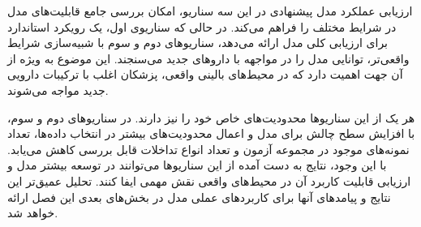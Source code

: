 ارزیابی عملکرد مدل پیشنهادی در این سه سناریو، امکان بررسی جامع قابلیت‌های مدل در شرایط مختلف را فراهم می‌کند. در حالی که سناریوی اول، یک رویکرد استاندارد برای ارزیابی کلی مدل ارائه می‌دهد، سناریوهای دوم و سوم با شبیه‌سازی شرایط واقعی‌تر، توانایی مدل را در مواجهه با داروهای جدید می‌سنجند. این موضوع به ویژه از آن جهت اهمیت دارد که در محیط‌های بالینی واقعی، پزشکان اغلب با ترکیبات دارویی جدید مواجه می‌شوند.

هر یک از این سناریوها محدودیت‌های خاص خود را نیز دارند. در سناریوهای دوم و سوم، با افزایش سطح چالش برای مدل و اعمال محدودیت‌های بیشتر در انتخاب داده‌ها، تعداد نمونه‌های موجود در مجموعه آزمون و تعداد انواع تداخلات قابل بررسی کاهش می‌یابد. با این وجود، نتایج به دست آمده از این سناریوها می‌توانند در توسعه بیشتر مدل و ارزیابی قابلیت کاربرد آن در محیط‌های واقعی نقش مهمی ایفا کنند. تحلیل عمیق‌تر این نتایج و پیامدهای آنها برای کاربردهای عملی مدل در بخش‌های بعدی این فصل ارائه خواهد شد.


